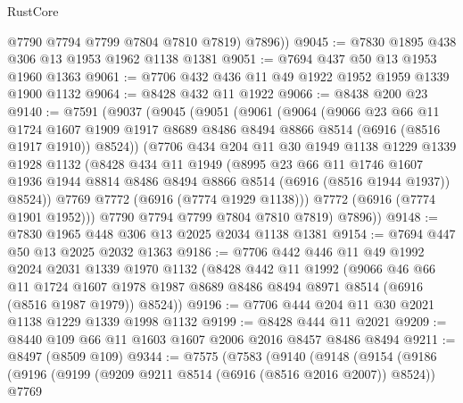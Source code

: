 \begin{lexlean}{RustCore}
\begin{coremodule}
          @7790
          @7794
          @7799
          @7804
          @7810
          @7819)
        @7896))
@9045 := @7830 @1895 @438 @306 @13 @1953 @1962 @1138 @1381
@9051 := @7694 @437 @50 @13 @1953 @1960 @1363
@9061 := @7706 @432 @436 @11 @49 @1922 @1952 @1959 @1339 @1900 @1132
@9064 := @8428 @432 @11 @1922
@9066 := @8438 @200 @23
@9140 := @7591
    (@9037
      (@9045
        (@9051
          (@9061
            (@9064
              (@9066
                @23
                @66
                @11
                @1724
                @1607
                @1909
                @1917
                @8689
                @8486
                @8494
                @8866
                @8514
                (@6916 (@8516 @1917 @1910))
                @8524))
            (@7706
              @434
              @204
              @11
              @30
              @1949
              @1138
              @1229
              @1339
              @1928
              @1132
              (@8428
                @434
                @11
                @1949
                (@8995
                  @23
                  @66
                  @11
                  @1746
                  @1607
                  @1936
                  @1944
                  @8814
                  @8486
                  @8494
                  @8866
                  @8514
                  (@6916 (@8516 @1944 @1937))
                  @8524))
              @7769
              @7772
              (@6916 (@7774 @1929 @1138)))
            @7772
            (@6916 (@7774 @1901 @1952)))
          @7790
          @7794
          @7799
          @7804
          @7810
          @7819)
        @7896))
@9148 := @7830 @1965 @448 @306 @13 @2025 @2034 @1138 @1381
@9154 := @7694 @447 @50 @13 @2025 @2032 @1363
@9186 := @7706
    @442
    @446
    @11
    @49
    @1992
    @2024
    @2031
    @1339
    @1970
    @1132
    (@8428
      @442
      @11
      @1992
      (@9066
        @46
        @66
        @11
        @1724
        @1607
        @1978
        @1987
        @8689
        @8486
        @8494
        @8971
        @8514
        (@6916 (@8516 @1987 @1979))
        @8524))
@9196 := @7706 @444 @204 @11 @30 @2021 @1138 @1229 @1339 @1998 @1132
@9199 := @8428 @444 @11 @2021
@9209 := @8440 @109 @66 @11 @1603 @1607 @2006 @2016 @8457 @8486 @8494
@9211 := @8497 (@8509 @109)
@9344 := @7575
    (@7583
      (@9140
        (@9148
          (@9154
            (@9186
              (@9196
                (@9199 (@9209 @9211 @8514 (@6916 (@8516 @2016 @2007)) @8524))
                @7769

\end{coremodule}
\end{lexlean}

